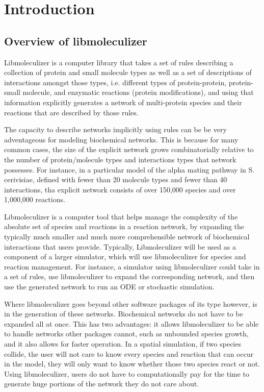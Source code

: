 \chapter{Introduction}
\label{chap:introduction}

\section{Overview of libmoleculizer}
Libmoleculizer is a computer library that takes a set of rules
describing a collection of protein and small molecule types as well as
a set of descriptions of interactions amongst those types,
i.e. different types of protein-protein, protein-small molecule, and
enzymatic reactions (protein modifications), and using that
information explicitly generates a network of multi-protein species
and their reactions that are described by those rules.

The capacity to describe networks implicitly using rules can be be
very adventageous for modeling biochemical networks.  This is because
for many common cases, the size of the explicit network grows
combinatorially relative to the number of protein/molecule types and
interactions types that network possesses.  For instance, in a particular
model of the alpha mating pathway in S. cerivisiae, defined
with fewer than 20 molecule types and fewer than 40 interactions, tha
explicit network consists of over 150,000 species and over 1,000,000
reactions.

Libmoleculizer is a computer tool that helps manage the complexity of
the absolute set of species and reactions in a reaction network, by
expanding the typically much smaller and much more comprehensible
network of biochemical interactions that users provide.  Typically,
Libmoleculizer will be used as a component of a larger simulator,
which will use libmoleculizer for species and reaction management.
For instance, a simulator using libmoleculizer could take in a set of
rules, use libmoleculizer to expand the corresponding network, and
then use the generated network to run an ODE or stochastic simulation.

Where libmoleculizer goes beyond other software packages of its type
however, is in the generation of these networks.  Biochemical networks
do not have to be expanded all at once.  This has two advantages: it
allows libmoleculizer to be able to handle networks other packages
cannot, such as unbounded species growth, and it also allows for
faster operation.  In a spatial simulation, if two species collide,
the user will not care to know every species and reaction that can
occur in the model, they will only want to know whether those two
species react or not.  Using libmoleculizer, users do not have to
computationally pay for the time to generate huge portions of the
network they do not care about.  

